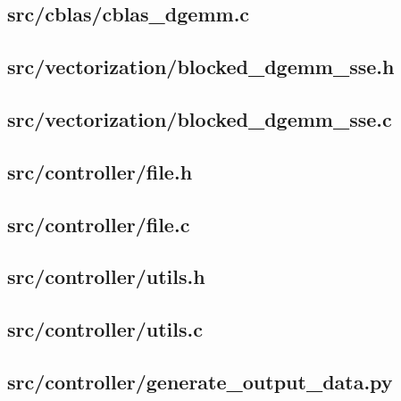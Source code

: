 \subsection{src/cblas/cblas\_dgemm.c}
	
	\newpage

\subsection{src/vectorization/blocked\_dgemm\_sse.h}
	
	\newpage

\subsection{src/vectorization/blocked\_dgemm\_sse.c}
	
	\newpage

\subsection{src/controller/file.h}
	
	\newpage

\subsection{src/controller/file.c}
	
	\newpage

\subsection{src/controller/utils.h}
	
	\newpage

\subsection{src/controller/utils.c}
	
	\newpage

\subsection{src/controller/generate\_output\_data.py}
	
	\newpage

